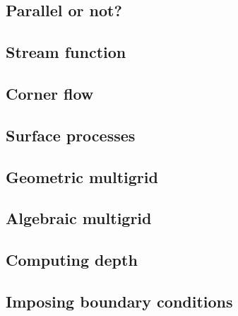 \documentclass[a4paper]{article}
\numberwithin{equation}{section}
\begin{document}
\subsection{Parallel or not?} \label{sec:parallel}  %
\newpage %
\subsection{Stream function} \label{sec:streamfunction}  %
\newpage %
\subsection{Corner flow} \label{sec:cornerflow}  %
\newpage %
\subsection{Surface processes \label{sec:surfaceprocesses}}  %
\newpage %
\subsection{Geometric multigrid}  %
\newpage %
\subsection{Algebraic multigrid}  %
\newpage %
\subsection{Computing depth \label{ss:depth}}  %
\newpage %
\subsection{Imposing boundary conditions \label{ss:howtobc}}  %
\newpage %
\end{document}
